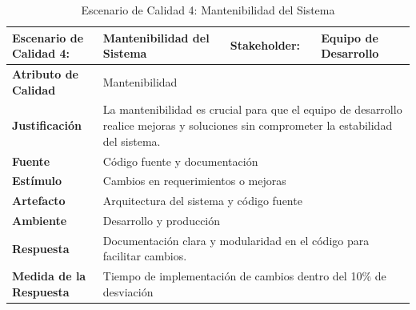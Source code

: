 \documentclass[12pt]{article}
\begin{document}
\begin{table}[H]
    \centering
    \begin{tabular}{|p{5cm}|p{3cm}|p{4cm}|p{4cm}|}
        \hline
        \multicolumn{1}{|p{5cm}|}{\cellcolor{teal!50}\textbf{Escenario de Calidad 4:}} & \multicolumn{1}{p{3cm}|}{Mantenibilidad del Sistema} & \multicolumn{1}{l|}{\cellcolor{teal!50}\textbf{Stakeholder:}} & \multicolumn{1}{l|}{Equipo de Desarrollo} \\ \hline
        \multicolumn{1}{|p{5cm}|}{\cellcolor{teal!50}\textbf{Atributo de Calidad}}    & \multicolumn{3}{p{11cm}|}{Mantenibilidad} \\ \hline
        \multicolumn{1}{|p{5cm}|}{\cellcolor{teal!50}\textbf{Justificación}}           & \multicolumn{3}{p{11cm}|}{La mantenibilidad es crucial para que el equipo de desarrollo realice mejoras y soluciones sin comprometer la estabilidad del sistema.} \\ \hline
        \multicolumn{1}{|p{5cm}|}{\cellcolor{teal!50}\textbf{Fuente}}                  & \multicolumn{3}{p{11cm}|}{Código fuente y documentación} \\ \hline
        \multicolumn{1}{|p{5cm}|}{\cellcolor{teal!50}\textbf{Estímulo}}                & \multicolumn{3}{p{11cm}|}{Cambios en requerimientos o mejoras} \\ \hline
        \multicolumn{1}{|p{5cm}|}{\cellcolor{teal!50}\textbf{Artefacto}}               & \multicolumn{3}{p{11cm}|}{Arquitectura del sistema y código fuente} \\ \hline
        \multicolumn{1}{|p{5cm}|}{\cellcolor{teal!50}\textbf{Ambiente}}                & \multicolumn{3}{p{11cm}|}{Desarrollo y producción} \\ \hline
        \multicolumn{1}{|p{5cm}|}{\cellcolor{teal!50}\textbf{Respuesta}}               & \multicolumn{3}{p{11cm}|}{Documentación clara y modularidad en el código para facilitar cambios.} \\ \hline
        \multicolumn{1}{|p{5cm}|}{\cellcolor{teal!50}\textbf{Medida de la Respuesta}}  & \multicolumn{3}{p{11cm}|}{Tiempo de implementación de cambios dentro del 10\% de desviación} \\ \hline
    \end{tabular}
    \caption{Escenario de Calidad 4: Mantenibilidad del Sistema}
    \label{tab:escenarios_calidad_4}
\end{table}
\end{document}
